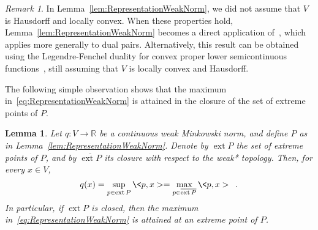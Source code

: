 \documentclass[a4paper,11pt]{amsart}
\newtheorem{lemma}[theorem]{Lemma}
\theoremstyle{definition}
\theoremstyle{remark}
\newtheorem{remark}[theorem]{Remark}
\begin{document}
\begin{remark}
  In Lemma~\ref{lem:RepresentationWeakNorm}, we did not assume that $V$ is Hausdorff and locally convex.
  When these properties hold, Lemma~\ref{lem:RepresentationWeakNorm} becomes a direct application of~\cite[Theorem 7.52]{AB06}, which applies more generally to dual pairs.
  Alternatively, this result can be obtained using the Legendre-Fenchel duality for convex proper lower semicontinuous functions~\cite[Proposition 4.1]{ET99}, still assuming that $V$ is locally convex and Hausdorff.
\end{remark}


The following simple observation shows that the maximum in~\eqref{eq:RepresentationWeakNorm} is attained in the closure of the set of extreme points of $P$.
\begin{lemma}
  \label{lem:RepresentationWeakNorm2}
  Let $q: V \to {\mathbb{R}}$ be a continuous weak Minkowski norm, and define $P$ as in Lemma~\ref{lem:RepresentationWeakNorm}.
  Denote by $\operatorname{ext}{P}$ the set of extreme points of $P$, and by ${\overline{{\operatorname{ext}{P}}}}$ its closure with respect to the weak* topology.
  Then, for every $x \in V$,
  \begin{equation}
    \label{eq:RepresentationWeakNorm2}
    q(x) = \sup_{p \in \operatorname{ext}{P}} \<p,x> = \max_{p \in {\overline{{\operatorname{ext}{P}}}}} \<p,x> \enspace .
  \end{equation}
  In particular, if $\operatorname{ext}{P}$ is closed, then the maximum in~\eqref{eq:RepresentationWeakNorm} is attained at an extreme point of $P$.
\end{lemma}

\end{document}

